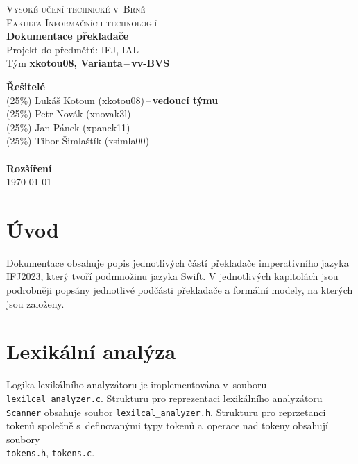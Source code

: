 \documentclass[11pt]{article}
\begin{document}
\begin{titlepage}
    \begin{center}
        \textsc{
        {\Huge Vysoké učení technické v~Brně}\\[0.5em]
        {\huge Fakulta Informačních technologií}} \\
        {\Huge \textbf{Dokumentace překladače}} \\[0.4em]
        {\Large Projekt do předmětů: IFJ, IAL} \\[2em]
        {\Large Tým \textbf{xkotou08, Varianta\,--\,vv-BVS}}
    \end{center}
    {\Large \textbf{Řešitelé}} \\[0.4em]
        {\Large
        \hspace*{0.5cm} (25\%) Lukáš Kotoun (xkotou08)\,--\,\textbf{vedoucí týmu}\\
        \hspace*{0.5cm} (25\%) Petr Novák (xnovak3l) \\
        \hspace*{0.5cm} (25\%) Jan Pánek (xpanek11) \\
        \hspace*{0.5cm} (25\%) Tibor Šimlaštík (xsimla00) \\
        }
     \\
    {\Large \textbf{Rozšíření}} \\[0.4em]


    {\Large \today}
\end{titlepage}


\tableofcontents
\newpage


\section{Úvod}
Dokumentace obsahuje popis jednotlivých částí překladače imperativního jazyka IFJ2023, který tvoří
podmnožinu jazyka Swift. V jednotlivých kapitolách jsou podrobněji popsány jednotlivé podčásti
překladače a formální modely, na kterých jsou založeny.



\section{Lexikální analýza}
Logika lexikálního analyzátoru je implementována v~souboru \texttt{lexilcal\_analyzer.c}. 
Strukturu pro reprezentaci lexikálního analyzátoru \texttt{Scanner} obsahuje soubor \texttt{lexilcal\_analyzer.h}.
Strukturu pro reprzetanci tokenů společně s~definovanými typy tokenů a~operace nad tokeny obsahují soubory \\ \texttt{tokens.h}, \texttt{tokens.c}.
\end{document}
